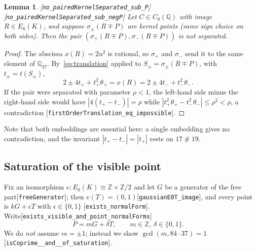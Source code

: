 \documentclass[10pt]{article}
\newtheorem{lemma}[theorem]{Lemma}
\theoremstyle{definition}
\theoremstyle{remark}
\newcommand{\Q}{\mathbb{Q}}
\newcommand{\Z}{\mathbb{Z}}
\newcommand{\leanref}[1]{{\scriptsize\textup{[\texttt{#1}]}}\allowbreak}
\begin{document}
\begin{lemma}\label{lem:no-separated}
\leanref{no\_\allowbreak paired\allowbreak Kernel\allowbreak Separated\_\allowbreak sub\_\allowbreak P} \leanref{no\_\allowbreak paired\allowbreak Kernel\allowbreak Separated\_\allowbreak sub\_\allowbreak neg\allowbreak P}
Let $C\in C_0(\Q)$ with image $R\in E_0(K)$, and suppose $\sigma_\pm(R\mp P)$
are kernel points (same sign choice on both sides).  Then the pair
$(\sigma_+(R\mp P),\sigma_-(R\mp P))$ is not separated.
\end{lemma}
\begin{proof}
The abscissa $x(R)=2u^2$ is rational, so $\sigma_+$ and $\sigma_-$ send it to
the same element of $\Q_{37}$.  By~\eqref{eq:translation} applied to
$S_\pm=\sigma_\pm(R\mp P)$, with $t_\pm=t(S_\pm)$,
\[
 2\pm4t_++t_+^2\theta_+=x(R)=2\pm4t_-+t_-^2\theta_- .
\]
If the pair were separated with parameter $\rho<1$, the left-hand side minus
the right-hand side would have $|4(t_+-t_-)|=\rho$ while
$|t_+^2\theta_+-t_-^2\theta_-|\le\rho^2<\rho$, a contradiction
\leanref{first\allowbreak Order\allowbreak Translation\_\allowbreak eq\_\allowbreak impossible}.
\end{proof}
Note that both embeddings are essential here: a single embedding gives no
contradiction, and the invariant $|t_+-t_-|=|t_+|$ rests on $17\not\equiv19$.

\subsection{Saturation of the visible point}\label{sec:saturation}

Fix an isomorphism $e:E_0(K)\cong\Z\times\Z/2$ and let $G$ be a generator of
the free part\leanref{free\allowbreak Generator}; then $e(T)=(0,1)$\leanref{gaussian\allowbreak E0\allowbreak T\_\allowbreak image},
and every point is $kG+\epsilon T$ with $\epsilon\in\{0,1\}$
\leanref{exists\_\allowbreak normal\allowbreak Form}.  Write\leanref{exists\_\allowbreak visible\_\allowbreak and\_\allowbreak point\_\allowbreak normal\allowbreak Forms}
\[
 P=mG+\delta T,\qquad m\in\Z,\ \delta\in\{0,1\}.
\]
We do \emph{not} assume $m=\pm1$; instead we show $\gcd(m,84\cdot37)=1$
\leanref{is\allowbreak Coprime\_\_\allowbreak and\_\allowbreak 37\_\allowbreak of\_\allowbreak saturation}.
\end{document}
